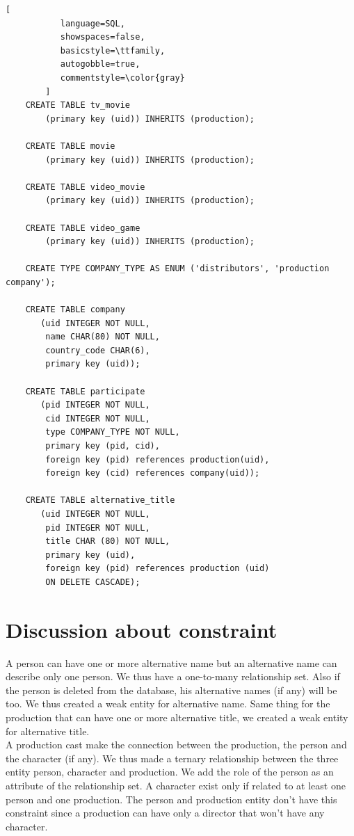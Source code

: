 \documentclass{article}
\begin{document}
\begin{lstlisting}[
           language=SQL,
           showspaces=false,
           basicstyle=\ttfamily,
           autogobble=true,
           commentstyle=\color{gray}
        ]
    CREATE TABLE tv_movie
        (primary key (uid)) INHERITS (production);
    
    CREATE TABLE movie
        (primary key (uid)) INHERITS (production);
    
    CREATE TABLE video_movie
        (primary key (uid)) INHERITS (production);
    
    CREATE TABLE video_game
        (primary key (uid)) INHERITS (production);
    
    CREATE TYPE COMPANY_TYPE AS ENUM ('distributors', 'production company');
    
    CREATE TABLE company
       (uid INTEGER NOT NULL,
        name CHAR(80) NOT NULL,
        country_code CHAR(6),
        primary key (uid));
    
    CREATE TABLE participate
       (pid INTEGER NOT NULL,
        cid INTEGER NOT NULL,
        type COMPANY_TYPE NOT NULL,
        primary key (pid, cid),
        foreign key (pid) references production(uid),
        foreign key (cid) references company(uid));
    
    CREATE TABLE alternative_title
       (uid INTEGER NOT NULL,
        pid INTEGER NOT NULL,
        title CHAR (80) NOT NULL,
        primary key (uid),
        foreign key (pid) references production (uid)
        ON DELETE CASCADE);
    \end{lstlisting}


\section{Discussion about constraint}
    A person can have one or more alternative name but an alternative name can describe only one person. We thus have a one-to-many relationship set. Also if the person is deleted from the database, his alternative names (if any) will be too. We thus created a weak entity for alternative name.
    Same thing for the production that can have one or more alternative title, we created a weak entity for alternative title. \\
    
    A production cast make the connection between the production, the person and the character (if any). We thus made a ternary relationship between the three entity person, character and production. We add the role of the person as an attribute of the relationship set. A character exist only if related to at least one person and one production. The person and production entity don't have this constraint since a production can have only a director that won't have any character.  \\
    
\end{document}
